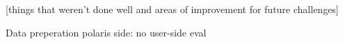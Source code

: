 \documentclass[journal=jcim,manuscript=article]{achemso}
\begin{document}
[things that weren’t done well and areas of improvement for future challenges]


Data preperation
polaris side:
no user-side eval


\end{document}
